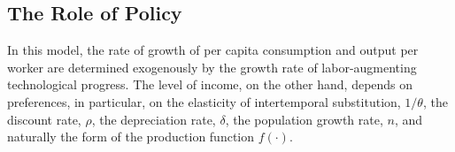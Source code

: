 \documentclass[\topdir/lecture\_notes.tex]{subfiles}
\begin{document}
\subsection{The Role of Policy}
In this model, the rate of growth of per capita consumption and output per worker are determined exogenously by the growth rate of labor-augmenting technological progress. The level of income, on the other hand, depends on preferences, in particular, on the elasticity of intertemporal substitution, \(1 / \theta\), the discount rate, \(\rho\), the depreciation rate, \(\delta\), the population growth rate, \(n\), and naturally the form of the production function \(f(\cdot)\).

\end{document}
